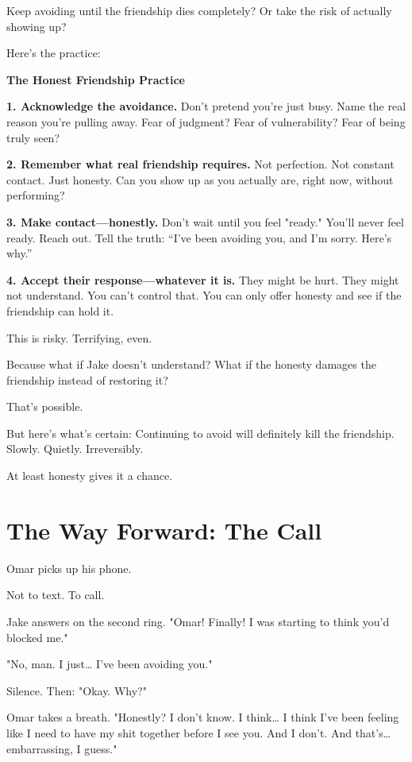 \documentclass[11pt,twoside]{book}
\begin{document}
Keep avoiding until the friendship dies completely? Or take the risk of actually showing up?

Here's the practice:

\begin{practicebox}
\textbf{The Honest Friendship Practice}

\textbf{1. Acknowledge the avoidance.}
Don't pretend you're just busy. Name the real reason you're pulling away. Fear of judgment? Fear of vulnerability? Fear of being truly seen?

\textbf{2. Remember what real friendship requires.}
Not perfection. Not constant contact. Just honesty. Can you show up as you actually are, right now, without performing?

\textbf{3. Make contact—honestly.}
Don't wait until you feel "ready." You'll never feel ready. Reach out. Tell the truth: ``I've been avoiding you, and I'm sorry. Here's why.''

\textbf{4. Accept their response—whatever it is.}
They might be hurt. They might not understand. You can't control that. You can only offer honesty and see if the friendship can hold it.
\end{practicebox}

This is risky. Terrifying, even.

Because what if Jake doesn't understand? What if the honesty damages the friendship instead of restoring it?

That's possible.

But here's what's certain: Continuing to avoid will definitely kill the friendship. Slowly. Quietly. Irreversibly.

At least honesty gives it a chance.

\section*{The Way Forward: The Call}

Omar picks up his phone.

Not to text. To call.

Jake answers on the second ring. "Omar! Finally! I was starting to think you'd blocked me."

"No, man. I just\ldots{} I've been avoiding you."

Silence. Then: "Okay. Why?"

Omar takes a breath. "Honestly? I don't know. I think\ldots{} I think I've been feeling like I need to have my shit together before I see you. And I don't. And that's\ldots{} embarrassing, I guess."
\end{document}
